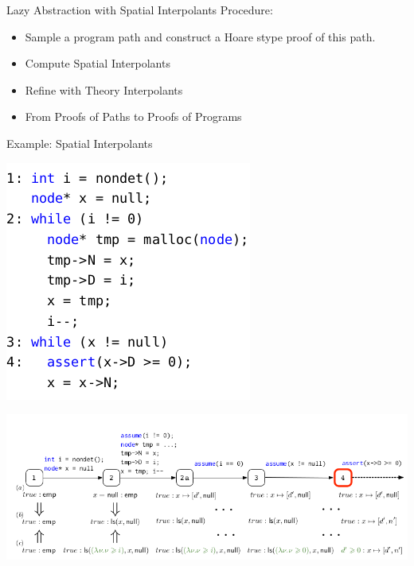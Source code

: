 \documentclass[aspectratio=1610, 13pt]{beamer}
\begin{document}
\begin{frame}{Lazy Abstraction with Spatial Interpolants}
Procedure:
\begin{itemize}
\item Sample a program path and construct a Hoare stype proof of this path.
\item Compute Spatial Interpolants
\item Refine with Theory Interpolants
\item From Proofs of Paths to Proofs of Programs
\end{itemize}
\end{frame}

\begin{frame}{Example: Spatial Interpolants}
\begin{center}
\includegraphics[scale=0.3]{8.png}

\includegraphics[scale=0.4]{9.png}
\end{center}
\end{frame}
\end{document}
